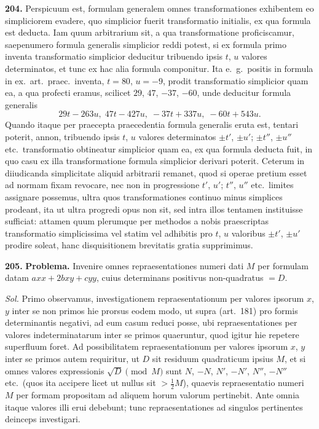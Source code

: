 \documentclass[12pt,a4paper]{article}
\theoremstyle{plain}
\theoremstyle{definition}
\theoremstyle{remark}
\begin{document}
\textbf{204.}
Perspicuum est, formulam generalem omnes transformationes exhibentem eo simpliciorem evadere, quo simplicior fuerit transformatio initialis, ex qua formula est deducta. Iam quum arbitrarium sit, a qua transformatione proficiscamur, saepenumero formula generalis simplicior reddi potest, si ex formula primo inventa transformatio simplicior deducitur tribuendo ipsis $t$, $u$ valores determinatos, et tunc ex hac alia formula componitur. Ita e.\ g.\ positis in formula in ex.\ art.\ praec.\ inventa, $t=80$, $u=-9$, prodit transformatio simplicior quam ea, a qua profecti eramus, scilicet $29$, $47$, $-37$, $-60$, unde deducitur formula generalis
\[
29t-263u,\; 47t-427u,\; -37t+337u,\; -60t+543u.
\]
Quando itaque per praecepta praecedentia formula generalis eruta est, tentari poterit, annon, tribuendo ipsis $t$, $u$ valores determinatos $\pm t'$, $\pm u'$; $\pm t''$, $\pm u''$ etc.\ transformatio obtineatur simplicior quam ea, ex qua formula deducta fuit, in quo casu ex illa transformatione formula simplicior derivari poterit. Ceterum in diiudicanda simplicitate aliquid arbitrarii remanet, quod si operae pretium esset ad normam fixam revocare, nec non in progressione $t'$, $u'$; $t''$, $u''$ etc.\ limites assignare possemus, ultra quos transformationes continuo minus simplices prodeant, ita ut ultra progredi opus non sit, sed intra illos tentamen instituisse sufficiat: attamen quum plerumque per methodos a nobis praescriptas transformatio simplicissima vel statim vel adhibitis pro $t$, $u$ valoribus $\pm t'$, $\pm u'$ prodire soleat, hanc disquisitionem brevitatis gratia supprimimus.

\textbf{205.}
\textbf{Problema.}
Invenire omnes repraesentationes numeri dati $M$ per formulam datam $axx+2bxy+cyy$, cuius determinans positivus non-quadratus $=D$.

\textit{Sol.}
Primo observamus, investigationem repraesentationum per valores ipsorum $x$, $y$ inter se non primos hie prorsus eodem modo, ut supra (art.\ 181) pro formis determinantis negativi, ad eum casum reduci posse, ubi repraesentationes per valores indeterminatarum inter se primos quaeruntur, quod igitur hie repetere superfluum foret. Ad possibilitatem repraesentationum per valores ipsorum $x$, $y$ inter se primos autem requiritur, ut $D$ sit residuum quadraticum ipsius $M$, et si omnes valores expressionis $\sqrt{D} \pmod{M}$ sunt $N$, $-N$, $N'$, $-N'$, $N''$, $-N''$ etc.\ (quos ita accipere licet ut nullus sit $>\frac{1}{2}M$), quaevis repraesentatio numeri $M$ per formam propositam ad aliquem horum valorum pertinebit. Ante omnia itaque valores illi erui debebunt; tunc repraesentationes ad singulos pertinentes deinceps investigari.
\end{document}
